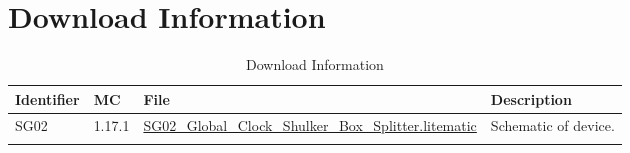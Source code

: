 \documentclass[10pt]{datasheet}
\begin{document}
\section{Download Information}
\begin{table}[H]
    \caption{Download Information}
    \begin{tabularx}{\textwidth}{l | l | l | X}
        \thickhline
        \textbf{Identifier} & \textbf{MC} & \textbf{File} & \textbf{Description} \\
        \hline
        SG02 & 1.17.1 & \href{https://github.com/Soontech-Annals/Archive/blob/b56572c0d2b4f182d9e9d41449d8cb2963b923ae/Archive/splitting/SG02\%20Global\%20Clock\%20Shulker\%20Box\%20Splitter/SG02\_Global\_Clock\_Shulker\_Box\_Splitter.litematic?raw=1}{SG02\_Global\_Clock\_Shulker\_Box\_Splitter.litematic} & Schematic of device. \\
        \hline
        \thickhline
    \end{tabularx}
\end{table}
\end{document}

